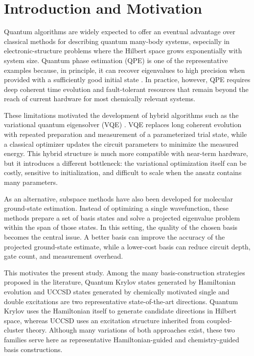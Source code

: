 \section{Introduction and Motivation}

Quantum algorithms are widely expected to offer an eventual advantage over classical methods for describing quantum many-body systems, especially in electronic-structure problems where the Hilbert space grows exponentially with system size. Quantum phase estimation (QPE) is one of the representative examples because, in principle, it can recover eigenvalues to high precision when provided with a sufficiently good initial state \cite{abrams1999qpe}. In practice, however, QPE requires deep coherent time evolution and fault-tolerant resources that remain beyond the reach of current hardware for most chemically relevant systems.

These limitations motivated the development of hybrid algorithms such as the variational quantum eigensolver (VQE) \cite{peruzzo2014vqe}. VQE replaces long coherent evolution with repeated preparation and measurement of a parameterized trial state, while a classical optimizer updates the circuit parameters to minimize the measured energy. This hybrid structure is much more compatible with near-term hardware, but it introduces a different bottleneck: the variational optimization itself can be costly, sensitive to initialization, and difficult to scale when the ansatz contains many parameters.

As an alternative, subspace methods have also been developed for molecular ground-state estimation. Instead of optimizing a single wavefunction, these methods prepare a set of basis states and solve a projected eigenvalue problem within the span of those states. In this setting, the quality of the chosen basis becomes the central issue. A better basis can improve the accuracy of the projected ground-state estimate, while a lower-cost basis can reduce circuit depth, gate count, and measurement overhead.

This motivates the present study. Among the many basis-construction strategies proposed in the literature, Quantum Krylov states generated by Hamiltonian evolution \cite{cortes2022qksd} and UCCSD states generated by chemically motivated single and double excitations \cite{anand2022ucc} are two representative state-of-the-art directions. Quantum Krylov uses the Hamiltonian itself to generate candidate directions in Hilbert space, whereas UCCSD uses an excitation structure inherited from coupled-cluster theory. Although many variations of both approaches exist, these two families serve here as representative Hamiltonian-guided and chemistry-guided basis constructions.

